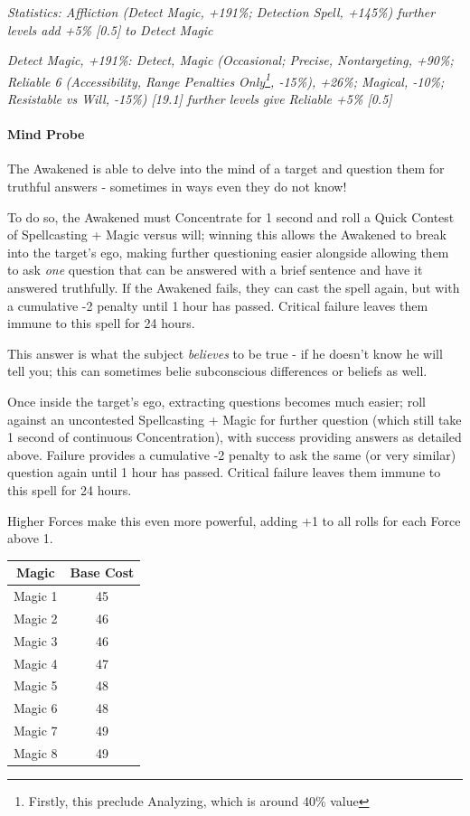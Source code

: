 \begin{multicols*}{3}
	\textcolor{OliveGreen}{\textit{ Statistics: Affliction (Detect Magic, +191\%; Detection Spell, +145\%) further levels add +5\% [0.5] to Detect Magic}}
	
	\textcolor{OliveGreen}{\textit{Detect Magic, +191\%: Detect, Magic (Occasional; Precise, Nontargeting, +90\%; Reliable 6 (Accessibility, Range Penalties Only\footnote{Firstly, this preclude Analyzing, which is around 40\% value}, -15\%), +26\%; Magical, -10\%; Resistable vs Will, -15\%) [19.1] further levels give Reliable +5\% [0.5]}}
		
	\paragraph{Mind Probe}
	
	The Awakened is able to delve into the mind of a target and question them for truthful answers - sometimes in ways even they do not know!
	
	To do so, the Awakened must Concentrate for 1 second and roll a Quick Contest of Spellcasting + Magic versus will; winning this allows the Awakened to break into the target's ego, making further questioning easier alongside allowing them to ask \textit{one} question that can be answered with a brief sentence and have it answered truthfully. If the Awakened fails, they can cast the spell again, but with a cumulative -2 penalty until 1 hour has passed. Critical failure leaves them immune to this spell for 24 hours.
	
	This answer is what the subject \textit{believes} to be true - if he doesn't know he will tell you; this can sometimes belie subconscious differences or beliefs as well.
	
	Once inside the target's ego, extracting questions becomes much easier; roll against an uncontested Spellcasting + Magic for further question (which still take 1 second of continuous Concentration), with success providing answers as detailed above. Failure provides a cumulative -2 penalty to ask the same (or very similar) question again until 1 hour has passed. Critical failure leaves them immune to this spell for 24 hours.
 	
 	Higher Forces make this even more powerful, adding +1 to all rolls for each Force above 1.
 	
	\begin{center}
		\begin{tabular}{|c|c|}
			\hline
			Magic & Base Cost \\
			\hline
			\hline
			Magic 1 & 45 \\
			Magic 2 & 46 \\
			Magic 3 & 46 \\
			Magic 4 & 47 \\
			Magic 5 & 48 \\
			Magic 6 & 48 \\
			Magic 7 & 49 \\
			Magic 8 & 49 \\
			\hline
		\end{tabular}
	\end{center} 
	

\end{multicols*}
